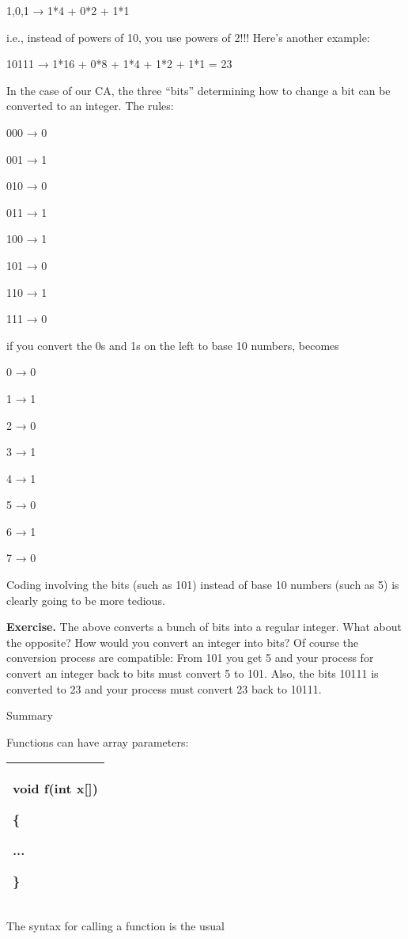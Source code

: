 \documentclass[
]{article}
\begin{document}
1,0,1 → 1*4 + 0*2 + 1*1

i.e., instead of powers of 10, you use powers of 2!!! Here's another
example:

10111 → 1*16 + 0*8 + 1*4 + 1*2 + 1*1 = 23

In the case of our CA, the three ``bits'' determining how to change a
bit can be converted to an integer. The rules:

000 → 0

001 → 1

010 → 0

011 → 1

100 → 1

101 → 0

110 → 1

111 → 0

if you convert the 0s and 1s on the left to base 10 numbers, becomes

0 → 0

1 → 1

2 → 0

3 → 1

4 → 1

5 → 0

6 → 1

7 → 0

Coding involving the bits (such as 101) instead of base 10 numbers (such
as 5) is clearly going to be more tedious.

\hfill\break
\textbf{Exercise.} The above converts a bunch of bits into a regular
integer. What about the opposite? How would you convert an integer into
bits? Of course the conversion process are compatible: From 101 you get
5 and your process for convert an integer back to bits must convert 5 to
101. Also, the bits 10111 is converted to 23 and your process must
convert 23 back to 10111.

Summary

Functions can have array parameters:

\begin{longtable}[]{@{}l@{}}
\toprule
\endhead
\begin{minipage}[t]{0.97\columnwidth}\raggedright
void f(int x{[}{]})

\{

...

\}\strut
\end{minipage}\tabularnewline
\bottomrule
\end{longtable}

The syntax for calling a function is the usual
\end{document}
